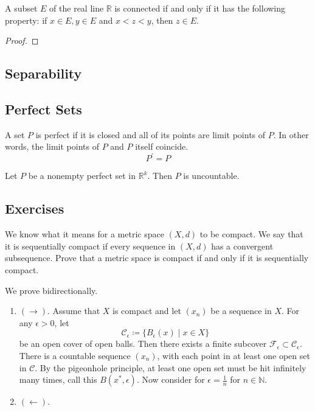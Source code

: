   \begin{theorem}
  A subset $E$ of the real line $\mathbb{R}$ is connected if and only if it has the following property: if $x \in E, y \in E$ and $x < z < y$, then $z \in E$. 
  \end{theorem}
  \begin{proof}

  \end{proof}

\subsection{Separability}

\subsection{Perfect Sets}

  \begin{definition}
    A set $P$ is perfect if it is closed and all of its points are limit points of $P$. In other words, the limit points of $P$ and $P$ itself coincide. 
    \begin{equation}
      P^\prime = P
    \end{equation}
  \end{definition}

  \begin{theorem}
    Let $P$ be a nonempty perfect set in $\mathbb{R}^k$. Then $P$ is uncountable. 
  \end{theorem}

\subsection{Exercises}

  \begin{exercise}
    We know what it means for a metric space $(X,d)$ to be compact. We say that it is sequentially compact if every sequence in $(X,d)$ has a convergent subsequence. Prove that a metric space is compact if and only if it is sequentially compact.
  \end{exercise}
  \begin{solution}
    We prove bidirectionally. 
    \begin{enumerate}
      \item $(\rightarrow)$. Assume that $X$ is compact and let $(x_n)$ be a sequence in $X$. For any $\epsilon > 0$, let 
      \begin{equation}
        \mathscr{C}_{\epsilon} \coloneqq \{B_{\epsilon} (x) \mid x \in X\}
      \end{equation}
      be an open cover of open balls. Then there exists a finite subcover $\mathcal{F}_\epsilon \subset \mathscr{C}_\epsilon$. There is a countable sequence $(x_n)$, with each point in at least one open set in $\mathscr{C}$. By the pigeonhole principle, at least one open set must be hit infinitely many times, call this $B (x^\ast, \epsilon)$. Now consider for $\epsilon = \frac{1}{n}$ for $n \in \mathbb{N}$. 
      \item $(\leftarrow)$. 
    \end{enumerate}
  \end{solution}

